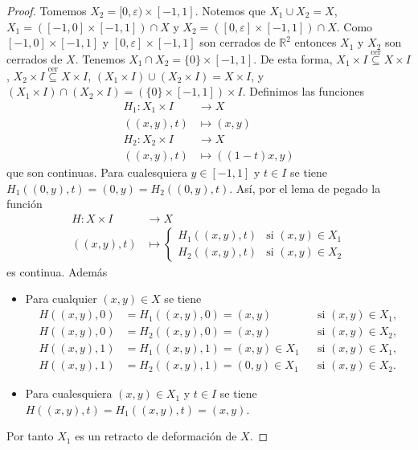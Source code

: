 \begin{proof}
Tomemos $X_2=[0,\varepsilon)\times[-1,1]$. Notemos que $X_1\cup X_2=X$, $X_1=([-1,0]\times[-1,1])\cap X$ y $X_2=([0,\varepsilon]\times[-1,1])\cap X$. Como $[-1,0]\times[-1,1]$ y $[0,\varepsilon]\times[-1,1]$ son cerrados de $\mathbb{R}^2$ entonces $X_1$ y $X_2$ son cerrados de $X$. Tenemos $X_1\cap X_2=\{0\}\times[-1,1]$. De esta forma, $X_1\times I\overset{\text{cer}}{\subseteq}X\times I$, $X_2\times I\overset{\text{cer}}{\subseteq}X\times I$, $(X_1\times I)\cup(X_2\times I)=X\times I$, y $(X_1\times I)\cap(X_2\times I)=(\{0\}\times[-1,1])\times I$. Definimos las funciones
\begin{align*}
H_1:X_1\times I&\to X\\
((x,y),t)&\mapsto(x,y)\\
H_2:X_2\times I&\to X\\
((x,y),t)&\mapsto((1-t)x,y)
\end{align*}
que son continuas. Para cualesquiera $y\in[-1,1]$ y $t\in I$ se tiene $H_1((0,y),t)=(0,y)=H_2((0,y),t)$. Así, por el lema de pegado la función
\begin{align*}
H:X\times I&\to X\\
((x,y),t)&\mapsto
\begin{cases}
H_1((x,y),t) & \text{si } (x,y)\in X_1\\
H_2((x,y),t) & \text{si } (x,y)\in X_2
\end{cases}
\end{align*}
es continua. Además
\begin{itemize}
\item Para cualquier $(x,y)\in X$ se tiene
\begin{align*}
H((x,y),0)&=H_1((x,y),0)=(x,y) &&\text{si } (x,y)\in X_1,\\
H((x,y),0)&=H_2((x,y),0)=(x,y) &&\text{si } (x,y)\in X_2,\\
H((x,y),1)&=H_1((x,y),1)=(x,y)\in X_1 &&\text{si } (x,y)\in X_1,\\
H((x,y),1)&=H_2((x,y),1)=(0,y)\in X_1 &&\text{si } (x,y)\in X_2.
\end{align*}
\item Para cualesquiera $(x,y)\in X_1$ y $t\in I$ se tiene $H((x,y),t)=H_1((x,y),t)=(x,y)$.
\end{itemize}
Por tanto $X_1$ es un retracto de deformación de $X$.
\end{proof}

